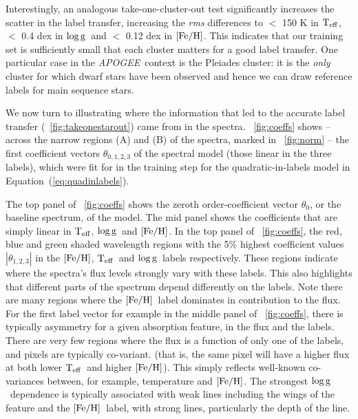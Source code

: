 \documentclass[12pt, preprint]{aastex}
\newcommand{\apogee}{\textsl{APOGEE}}
\newcommand{\teff}{\mbox{$\rm T_{eff}$}}
\newcommand{\feh}{\mbox{$\rm [Fe/H]$}}
\newcommand{\logg}{\mbox{$\rm \log g$}}
\begin{document}
Interestingly, an analogous take-one-cluster-out test significantly increases the scatter in the label transfer, 
increasing the \textit{rms} differences to $<$ 150 K in \teff, $<$ 0.4 dex in \logg\ and $<$ 0.12 dex in \feh.
This indicates that our training set is sufficiently small that each cluster matters for a good label transfer. 
One particular case in the \apogee\ context is the Pleiades cluster: it is the \textit{only} cluster for which dwarf stars have been observed and hence we can draw reference labels for main sequence stars. 
 
We now turn to illustrating where the information that led to the accurate label transfer (\figurename~\ref{fig:takeonestarout}) came from in the spectra.
\figurename~\ref{fig:coeffs} shows -- across the narrow regions (A) and (B) of the spectra, marked in \figurename~\ref{fig:norm} -- the first coefficient vectors $\theta_{0,1,2,3}$ of the spectral model (those linear in the three labels), which were fit for in the training step for the quadratic-in-labels model in Equation~(\ref{eq:quadinlabels}). 


The top panel of \figurename~\ref{fig:coeffs} shows the zeroth order-coefficient vector $\theta_0$, or the baseline spectrum, of the model. 
The mid panel shows the coefficients that are simply linear in \teff, \logg\ and \feh.
In the top panel of \figurename~\ref{fig:coeffs}, the red, blue and green shaded wavelength regions with the 5\% 
highest coefficient values $|\theta_{1,2,3}|$ in the \feh, \teff\ and \logg\ labels respectively. 
These regions indicate where the spectra's flux levels strongly vary with these labels.
This also highlights that different parts of the spectrum depend differently on the labels. Note there are many regions where the \feh\ label dominates in contribution to the flux.
For the first label vector for example in the middle panel of \figurename~\ref{fig:coeffs}, 
there is typically asymmetry for a given absorption feature, in the flux and the labels. 
There are very few regions where the flux is a function of only one of the labels, and pixels are typically co-variant. 
(that is, the same pixel will have a higher flux at both lower \teff\ and higher \feh). 
This simply reflects well-known co-variances between, for example, temperature and \feh .
The strongest \logg\ dependence is typically associated with weak lines including the wings of the 
feature and the \feh\ label, with strong lines, particularly the depth of the line. 
\end{document}
